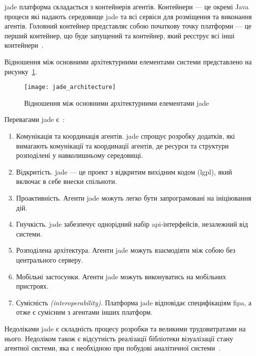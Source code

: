 \acrshort{jade} платформа складається з контейнерів агентів. 
Контейнери --- це окремі Java процеси які надають середовище \acrshort{jade} та всі сервіси для розміщення та виконання агентів. 
Головний контейнер представляє собою початкову точку платформи --- це перший контейнер, що буде запущений та контейнер, який реєструє всі інші контейнери~\cite{Bellifemine2007}.

Відношення між основними архітектурними елементами системи представлено на рисунку~\ref{fig:jade_architecture}.

\begin{figure}[H]
	\centering
	\texttt{[image: jade\_architecture]}
	\caption{Відношення між основними архітектурними елементами \acrshort{jade}~\cite{Bellifemine2007}}
	\label{fig:jade_architecture}
\end{figure}

Перевагами \acrshort{jade} є~\cite{Bellifemine2003}:
\begin{enumerate}
	\item Комунікація та координація агентів. \acrshort{jade} спрощує розробку додатків, які вимагають комунікації та координації агентів, де ресурси та структури розподілені у навколишньому середовищі.
	\item Відкритість. \acrshort{jade} --- це проект з відкритим вихідним кодом (\acrshort{lgpl}), який включає в себе внески спільноти. 
	\item Проактивність. Агенти \acrshort{jade} можуть легко бути запрограмовані на ініціювання дій. 
	\item Гнучкість. \acrshort{jade} забезпечує однорідний набір \acrshort{api}-інтерфейсів, незалежний від системи.
	\item Розподілена архітектура. Агенти \acrshort{jade} можуть взаємодіяти між собою без центрального серверу. 
	\item Мобільні застосунки. Агенти \acrshort{jade} можуть виконуватись на мобільних пристроях.
	\item Сумісність \textit{(interoperability)}. Платформа \acrshort{jade} відповідає специфікаціям \acrshort{fipa}, а отже є сумісним з агентами інших платформ.
\end{enumerate}

Недоліками \acrshort{jade} є складність процесу розробки та великими трудовитратами на нього. 
Недоліком також є відсутність реалізації бібліотеки візуалізації стану агентної системи, яка є необхідною при побудові аналітичної системи~\cite{Kravari2015}.


